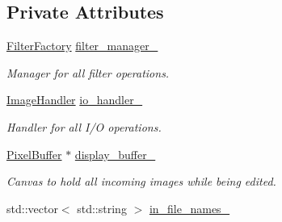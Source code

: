 \subsection*{Private Attributes}
\begin{DoxyCompactItemize}
\item 
\hyperlink{classimage__tools_1_1FilterFactory}{Filter\+Factory} \hyperlink{classimage__tools_1_1MIACommandlineManager_a4b3fc983d2020e89631feff967a50039}{filter\+\_\+manager\+\_\+}\hypertarget{classimage__tools_1_1MIACommandlineManager_a4b3fc983d2020e89631feff967a50039}{}\label{classimage__tools_1_1MIACommandlineManager_a4b3fc983d2020e89631feff967a50039}

\begin{DoxyCompactList}\small\item\em Manager for all filter operations. \end{DoxyCompactList}\item 
\hyperlink{classimage__tools_1_1ImageHandler}{Image\+Handler} \hyperlink{classimage__tools_1_1MIACommandlineManager_a6668bb99b6c6b24a2da572babd136fa0}{io\+\_\+handler\+\_\+}\hypertarget{classimage__tools_1_1MIACommandlineManager_a6668bb99b6c6b24a2da572babd136fa0}{}\label{classimage__tools_1_1MIACommandlineManager_a6668bb99b6c6b24a2da572babd136fa0}

\begin{DoxyCompactList}\small\item\em Handler for all I/O operations. \end{DoxyCompactList}\item 
\hyperlink{classimage__tools_1_1PixelBuffer}{Pixel\+Buffer} $\ast$ \hyperlink{classimage__tools_1_1MIACommandlineManager_a77553a1c2f41c056ea252fbe467c2dd2}{display\+\_\+buffer\+\_\+}\hypertarget{classimage__tools_1_1MIACommandlineManager_a77553a1c2f41c056ea252fbe467c2dd2}{}\label{classimage__tools_1_1MIACommandlineManager_a77553a1c2f41c056ea252fbe467c2dd2}

\begin{DoxyCompactList}\small\item\em Canvas to hold all incoming images while being edited. \end{DoxyCompactList}\item 
std\+::vector$<$ std\+::string $>$ \hyperlink{classimage__tools_1_1MIACommandlineManager_ad0285416643242c438f94d21be0d65a7}{in\+\_\+file\+\_\+names\+\_\+}\hypertarget{classimage__tools_1_1MIACommandlineManager_ad0285416643242c438f94d21be0d65a7}{}\label{classimage__tools_1_1MIACommandlineManager_ad0285416643242c438f94d21be0d65a7}


\end{DoxyCompactItemize}
